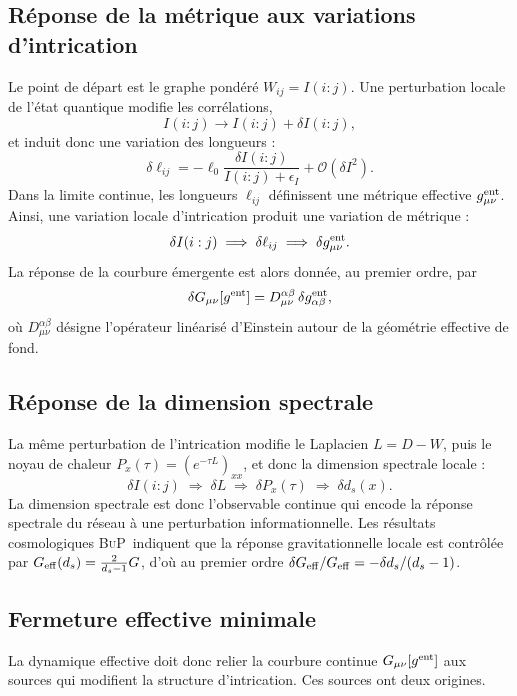 \documentclass[11pt]{article}
\newcommand{\Geff}{G_{\rm eff}}
\newcommand{\BuP}{\textsc{BuP}}
\begin{document}
\subsection{R\'eponse de la m\'etrique aux variations d'intrication}

Le point de d\'epart est le graphe pond\'er\'e $W_{ij}=I(i:j)$.
Une perturbation locale de l'\'etat quantique modifie les corr\'elations,
\[
I(i:j)\to I(i:j)+\delta I(i:j),
\]
et induit donc une variation des longueurs :
\[
\delta\ell_{ij}=-\ell_0\frac{\delta I(i:j)}{I(i:j)+\epsilon_I}+\mathcal{O}(\delta I^2).
\]
Dans la limite continue, les longueurs $\ell_{ij}$ d\'efinissent une m\'etrique effective
$g_{\mu\nu}^{\rm ent}$. Ainsi, une variation locale d'intrication produit une variation
de m\'etrique :
\[
\delta I(i:j)
\;\Longrightarrow\;
\delta\ell_{ij}
\;\Longrightarrow\;
\delta g_{\mu\nu}^{\rm ent}.
\]
La r\'eponse de la courbure \'emergente est alors donn\'ee, au premier ordre, par
\[
\delta G_{\mu\nu}[g^{\rm ent}]=D_{\mu\nu}^{\alpha\beta}\,\delta g_{\alpha\beta}^{\rm ent},
\]
o\`u $D_{\mu\nu}^{\alpha\beta}$ d\'esigne l'op\'erateur lin\'earis\'e d'Einstein autour
de la g\'eom\'etrie effective de fond.

\subsection{R\'eponse de la dimension spectrale}

La m\^eme perturbation de l'intrication modifie le Laplacien $L=D-W$, puis le
noyau de chaleur $P_x(\tau)=\left(e^{-\tau L}\right)_{xx}$, et donc la dimension
spectrale locale :
\[
\delta I(i:j)
\;\Longrightarrow\;
\delta L
\;\Longrightarrow\;
\delta P_x(\tau)
\;\Longrightarrow\;
\delta d_s(x).
\]
La dimension spectrale est donc l'observable continue qui encode la r\'eponse spectrale
du r\'eseau \`a une perturbation informationnelle. Les r\'esultats cosmologiques \BuP\
indiquent que la r\'eponse gravitationnelle locale est contr\^ol\'ee par
$\Geff(d_s)=\frac{2}{d_s-1}G$, d'o\`u au premier ordre
$\delta\Geff/\Geff=-\delta d_s/(d_s-1)$.

\subsection{Fermeture effective minimale}

La dynamique effective doit donc relier la courbure continue $G_{\mu\nu}[g^{\rm ent}]$
aux sources qui modifient la structure d'intrication. Ces sources ont deux origines.
\end{document}
